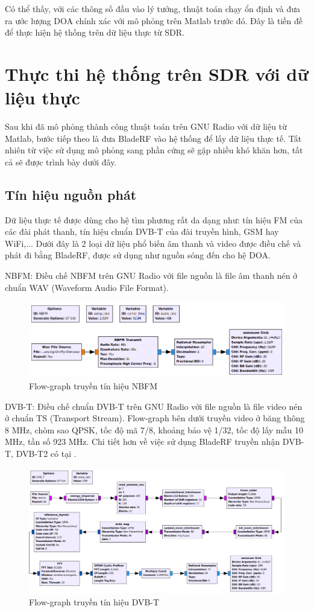 {Có thể thấy, với các thông số đầu vào lý tưởng, thuật toán chạy ổn định và đưa ra ước lượng DOA chính xác với mô phỏng trên Matlab trước đó. Đây là tiền đề để thực hiện hệ thống trên dữ liệu thực từ SDR.

\section{Thực thi hệ thống trên SDR với dữ liệu thực}

Sau khi đã mô phỏng thành công thuật toán trên GNU Radio với dữ liệu từ Matlab, bước tiếp theo là đưa BladeRF vào hệ thống để lấy dữ liệu thực tế. Tất nhiên từ việc sử dụng mô phỏng sang phần cứng sẽ gặp nhiều khó khăn hơn, tất cả sẽ được trình bày dưới đây.

\subsection{Tín hiệu nguồn phát}

Dữ liệu thực tế được dùng cho hệ tìm phương rất da dạng như: tín hiệu FM của các đài phát thanh, tín hiệu chuẩn DVB-T của đài truyền hình, GSM hay WiFi,... Dưới đây là 2 loại dữ liệu phổ biến âm thanh và video được điều chế và phát đi bằng BladeRF, được sử dụng như nguồn sóng đến cho hệ DOA.

NBFM: Điều chế NBFM trên GNU Radio với file nguồn là file âm thanh nén ở chuẩn WAV (Waveform Audio File Format).
\begin{figure} [!h]
	\centering
	\includegraphics[width=0.9\linewidth]{figures/NBFM.png}
	\caption{Flow-graph truyền tín hiệu NBFM}
	\label{fig:NBFM}
\end{figure}

DVB-T: Điều chế chuẩn DVB-T trên GNU Radio với file nguồn là file video nén ở chuẩn TS (Transport Stream). Flow-graph bên dưới truyền video ở băng thông 8 MHz, chòm sao QPSK, tốc độ mã 7/8, khoảng bảo vệ 1/32, tốc độ lấy mẫu 10 MHz, tần số 923 MHz. Chi tiết hơn về việc sử dụng BladeRF truyền nhận DVB-T, DVB-T2 có tại \cite{BogdanDIA2015}.
\begin{figure} [!h]
	\centering
	\includegraphics[width=0.95\linewidth]{figures/dvbt.png}
	\caption{Flow-graph truyền tín hiệu DVB-T}
	\label{fig:dvbt}
\end{figure}

}
